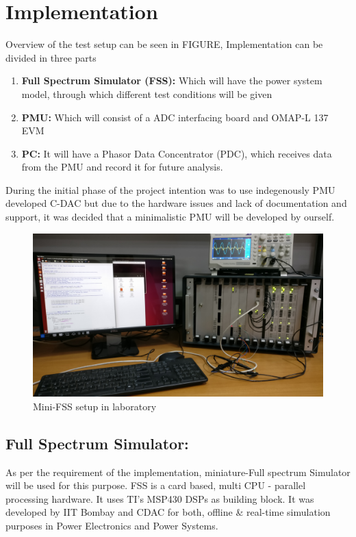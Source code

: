 \section{Implementation}
Overview of the test setup can be seen in FIGURE, Implementation can be divided in three parts
\begin{enumerate}
\item \textbf{Full Spectrum Simulator (FSS):} Which will have the power system model, through which different test conditions will be given
\item \textbf{PMU:} Which will consist of a ADC interfacing board and OMAP-L 137 EVM
\item \textbf{PC:} It will have a Phasor Data Concentrator (PDC), which receives data from the PMU and record it for future analysis.
\end{enumerate}
During the initial phase of the project intention was to use indegenously PMU developed C-DAC but due to the hardware issues and lack of documentation and support, it was decided that a minimalistic PMU will be developed by ourself.

\begin{figure}[th]
\centering
\includegraphics[width=\textwidth]{fig/FSS_setup.jpg}
\caption{Mini-FSS setup in laboratory}
\label{fig:fss_setup}
\end{figure}

\subsection{Full Spectrum Simulator:}
As per the requirement of the implementation, miniature-Full spectrum Simulator will be used for this purpose. FSS is a card based, multi CPU - parallel processing hardware. It uses TI's MSP430 DSPs as building block. It was developed by IIT Bombay and CDAC for both, offline \& real-time  simulation purposes in Power Electronics and Power Systems.


